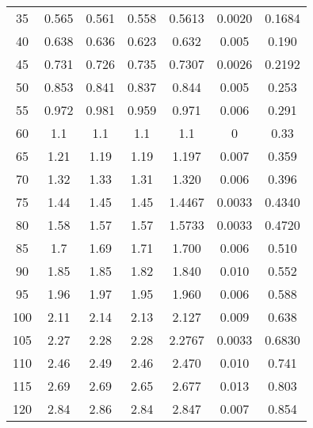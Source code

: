 \begin{table}[H]
{\begin{tabular}{
      S[table-format=3.0] 
      S[table-format=1.4] S[table-format=1.4] S[table-format=1.4]
      S[table-format=1.4] S[table-format=1.4] S[table-format=1.3]
      }
      35  & 0.565  & 0.561  & 0.558  & 0.5613  & 0.0020  & 0.1684 \\
      40  & 0.638  & 0.636  & 0.623  & 0.632   & 0.005   & 0.190  \\
      45  & 0.731  & 0.726  & 0.735  & 0.7307  & 0.0026  & 0.2192 \\
      50  & 0.853  & 0.841  & 0.837  & 0.844   & 0.005   & 0.253  \\
      55  & 0.972  & 0.981  & 0.959  & 0.971   & 0.006   & 0.291  \\
      60  & 1.1    & 1.1    & 1.1    &  1.1    & 0       & 0.33   \\
      65  & 1.21   & 1.19   & 1.19   & 1.197   & 0.007   & 0.359  \\
      70  & 1.32   & 1.33   & 1.31   & 1.320   & 0.006   & 0.396  \\
      75  & 1.44   & 1.45   & 1.45   & 1.4467  & 0.0033  & 0.4340 \\
      80  & 1.58   & 1.57   & 1.57   & 1.5733  & 0.0033  & 0.4720 \\
      85  & 1.7    & 1.69   & 1.71   & 1.700   & 0.006   & 0.510  \\
      90  & 1.85   & 1.85   & 1.82   & 1.840   & 0.010   & 0.552  \\
      95  & 1.96   & 1.97   & 1.95   & 1.960   & 0.006   & 0.588  \\
      100 & 2.11   & 2.14   & 2.13   & 2.127   & 0.009   & 0.638  \\
      105 & 2.27   & 2.28   & 2.28   & 2.2767  & 0.0033  & 0.6830 \\
      110 & 2.46   & 2.49   & 2.46   & 2.470   & 0.010   & 0.741  \\
      115 & 2.69   & 2.69   & 2.65   & 2.677   & 0.013   & 0.803  \\
      120 & 2.84   & 2.86   & 2.84   & 2.847   & 0.007   & 0.854  \\
      \bottomrule   
    \end{tabular}
    }
\end{table}
%
